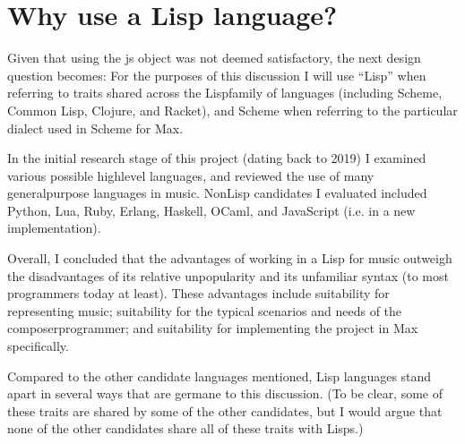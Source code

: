 \documentclass[letterpaper,10pt,english]{sphinxmanual}
\begin{document}
\section{Why use a Lisp language?}
\label{\detokenize{design:why-use-a-lisp-language}}
\sphinxAtStartPar
Given that using the js object was not deemed satisfactory, the next design question becomes:
For the purposes of this discussion I will use “Lisp” when referring to traits shared across the Lisp\sphinxhyphen{}family of languages
(including Scheme, Common Lisp, Clojure, and Racket), and Scheme when referring to the particular dialect used in Scheme for Max.

\sphinxAtStartPar
In the initial research stage of this project (dating back to 2019) I examined various possible high\sphinxhyphen{}level languages,
and reviewed the use of many general\sphinxhyphen{}purpose languages in music.
Non\sphinxhyphen{}Lisp candidates I evaluated included Python, Lua, Ruby, Erlang, Haskell, OCaml, and JavaScript (i.e. in a new implementation).

\sphinxAtStartPar
Overall, I concluded that the advantages of working in a Lisp for music outweigh the disadvantages
of its relative unpopularity and its unfamiliar syntax (to most programmers today at least).
These advantages include suitability for representing music; suitability for the typical scenarios and needs of the composer\sphinxhyphen{}programmer;
and suitability for implementing the project in Max specifically.

\sphinxAtStartPar
Compared to the other candidate languages mentioned, Lisp languages stand apart in several ways that are germane to this
discussion. (To be clear, some of these traits are shared by some of the other candidates, but I would argue that none of the
other candidates share all of these traits with Lisps.)
\end{document}
